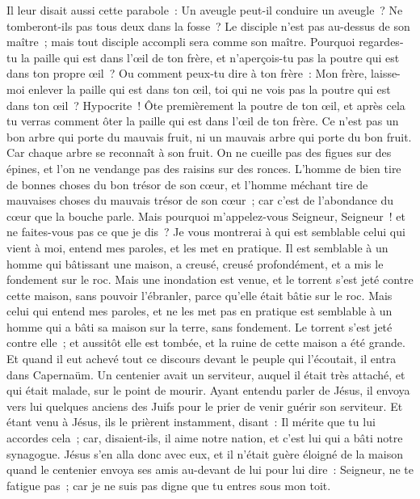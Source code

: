 \begin{multicols}{2}
Il leur disait aussi cette parabole~: Un aveugle peut-il conduire un aveugle~? Ne tomberont-ils pas tous deux dans la fosse~?
Le disciple n'est pas au-dessus de son maître~; mais tout disciple accompli sera comme son maître.
Pourquoi regardes-tu la paille qui est dans l'œil de ton frère, et n'aperçois-tu pas la poutre qui est dans ton propre œil~?
Ou comment peux-tu dire à ton frère~: Mon frère, laisse-moi enlever la paille qui est dans ton œil, toi qui ne vois pas la poutre qui est dans ton œil~? Hypocrite~! Ôte premièrement la poutre de ton œil, et après cela tu verras comment ôter la paille qui est dans l'œil de ton frère.
Ce n'est pas un bon arbre qui porte du mauvais fruit, ni un mauvais arbre qui porte du bon fruit.
Car chaque arbre se reconnaît à son fruit. On ne cueille pas des figues sur des épines, et l'on ne vendange pas des raisins sur des ronces.
L'homme de bien tire de bonnes choses du bon trésor de son cœur, et l'homme méchant tire de mauvaises choses du mauvais trésor de son cœur~; car c'est de l'abondance du cœur que la bouche parle.
Mais pourquoi m'appelez-vous Seigneur, Seigneur~! et ne faites-vous pas ce que je dis~?
Je vous montrerai à qui est semblable celui qui vient à moi, entend mes paroles, et les met en pratique.
Il est semblable à un homme qui bâtissant une maison, a creusé, creusé profondément, et a mis le fondement sur le roc. Mais une inondation est venue, et le torrent s'est jeté contre cette maison, sans pouvoir l'ébranler, parce qu'elle était bâtie sur le roc.
Mais celui qui entend mes paroles, et ne les met pas en pratique est semblable à un homme qui a bâti sa maison sur la terre, sans fondement. Le torrent s'est jeté contre elle~; et aussitôt elle est tombée, et la ruine de cette maison a été grande.
\VerseOne{}Et quand il eut achevé tout ce discours devant le peuple qui l'écoutait, il entra dans Capernaüm.
Un centenier avait un serviteur, auquel il était très attaché, et qui était malade, sur le point de mourir.
Ayant entendu parler de Jésus, il envoya vers lui quelques anciens des Juifs pour le prier de venir guérir son serviteur.
Et étant venu à Jésus, ils le prièrent instamment, disant~: Il mérite que tu lui accordes cela~;
car, disaient-ils, il aime notre nation, et c'est lui qui a bâti notre synagogue.
Jésus s'en alla donc avec eux, et il n'était guère éloigné de la maison quand le centenier envoya ses amis au-devant de lui pour lui dire~: Seigneur, ne te fatigue pas~; car je ne suis pas digne que tu entres sous mon toit.

\end{multicols}
